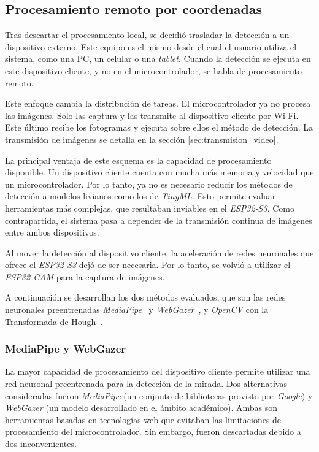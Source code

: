 

\subsection{Procesamiento remoto por coordenadas}

Tras descartar el procesamiento local, se decidió trasladar la detección a un dispositivo externo. Este equipo es el mismo desde el cual el usuario utiliza el sistema, como una PC, un celular o una \emph{tablet}. Cuando la detección se ejecuta en este dispositivo cliente, y no en el microcontrolador, se habla de procesamiento remoto.

Este enfoque cambia la distribución de tareas. El microcontrolador ya no procesa las imágenes. Solo las captura y las transmite al dispositivo cliente por Wi-Fi. Este último recibe los fotogramas y ejecuta sobre ellos el método de detección. La transmisión de imágenes se detalla en la sección \ref{sec:transmision_video}.

La principal ventaja de este esquema es la capacidad de procesamiento disponible. Un dispositivo cliente cuenta con mucha más memoria y velocidad que un microcontrolador. Por lo tanto, ya no es necesario reducir los métodos de detección a modelos livianos como los de \emph{TinyML}. Esto permite evaluar herramientas más complejas, que resultaban inviables en el \emph{ESP32-S3}. Como contrapartida, el sistema pasa a depender de la transmisión continua de imágenes entre ambos dispositivos.

Al mover la detección al dispositivo cliente, la aceleración de redes neuronales que ofrece el \emph{ESP32-S3} dejó de ser necesaria. Por lo tanto, se volvió a utilizar el \emph{ESP32-CAM} para la captura de imágenes.

A continuación se desarrollan los dos métodos evaluados, que son las redes neuronales preentrenadas \emph{MediaPipe}~\cite{mediapipe} y \emph{WebGazer}~\cite{webgazer}, y \emph{OpenCV} con la Transformada de Hough~\cite{opencv_features,opencv_houghcircles}.

\subsubsection{MediaPipe y WebGazer}

La mayor capacidad de procesamiento del dispositivo cliente permite utilizar una red neuronal preentrenada para la detección de la mirada. Dos alternativas consideradas fueron \emph{MediaPipe} (un conjunto de bibliotecas provisto por \emph{Google}) y \emph{WebGazer} (un modelo desarrollado en el ámbito académico). Ambas son herramientas basadas en tecnologías web que evitaban las limitaciones de procesamiento del microcontrolador. Sin embargo, fueron descartadas debido a dos inconvenientes.

